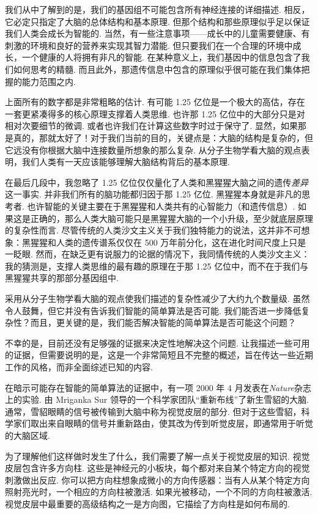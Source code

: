 我们从中了解到的是，我们的基因组不可能包含所有神经连接的详细描述. 相反，它必定只指定了大脑的总体结构和基本原理. 但那个结构和那些原理似乎足以保证我们人类会成长为智能的. 当然，有一些注意事项——成长中的儿童需要健康、有刺激的环境和良好的营养来实现其智力潜能. 但只要我们在一个合理的环境中成长，一个健康的人将拥有非凡的智能. 在某种意义上，我们基因中的信息包含了我们如何思考的精髓. 而且此外，那遗传信息中包含的原理似乎很可能在我们集体把握的能力范围之内.

上面所有的数字都是非常粗略的估计. 有可能 1.25 亿位是一个极大的高估，存在一套更紧凑得多的核心原理支撑着人类思维. 也许那 1.25 亿位中的大部分只是对相对次要细节的微调. 或者也许我们在计算这些数字时过于保守了. 显然，如果那是真的，那就太好了！对于我们当前的目的，关键点是：大脑的结构是复杂的，但它远没有你根据大脑中连接数量所想象的那么复杂. 从分子生物学看大脑的观点表明，我们人类有一天应该能够理解大脑结构背后的基本原理.

在最后几段中，我忽略了 1.25 亿位仅仅量化了人类和黑猩猩大脑之间的遗传\emph{差异}这一事实. 并非我们所有的脑功能都归因于那 1.25 亿位. 黑猩猩本身就是非凡的思考者. 也许智能的关键主要在于黑猩猩和人类共有的心智能力（和遗传信息）. 如果这是正确的，那么人类大脑可能只是黑猩猩大脑的一个小升级，至少就底层原理的复杂性而言. 尽管传统的人类沙文主义关于我们独特能力的说法，这并非不可想象：黑猩猩和人类的遗传谱系仅仅在 500 万年前分化，这在进化时间尺度上只是一眨眼. 然而，在缺乏更有说服力的论据的情况下，我同情传统的人类沙文主义：我的猜测是，支撑人类思维的最有趣的原理在于那 1.25 亿位中，而不在于我们与黑猩猩共享的那部分基因组中.

采用从分子生物学看大脑的观点使我们描述的复杂性减少了大约九个数量级. 虽然令人鼓舞，但它并没有告诉我们智能的简单算法是否可能. 我们能否进一步降低复杂性？而且，更关键的是，我们能否解决智能的简单算法是否可能这个问题？

不幸的是，目前还没有足够强的证据来决定性地解决这个问题. 让我描述一些可用的证据，但需要说明的是，这是一个非常简短且不完整的概述，旨在传达一些近期工作的风格，而非全面综述已知的内容.

在暗示可能存在智能的简单算法的证据中，有一项 2000 年 4 月发表在\emph{Nature}杂志上的实验. 由 Mriganka Sur 领导的一个科学家团队``重新布线''了新生雪貂的大脑. 通常，雪貂眼睛的信号被传输到大脑中称为视觉皮层的部分. 但对于这些雪貂，科学家们取出来自眼睛的信号并重新路由，使其改为传到听觉皮层，即通常用于听觉的大脑区域.

为了理解他们这样做时发生了什么，我们需要了解一点关于视觉皮层的知识. 视觉皮层包含许多方向柱. 这些是神经元的小板块，每个都对来自某个特定方向的视觉刺激做出反应. 你可以把方向柱想象成微小的方向传感器：当有人从某个特定方向照射亮光时，一个相应的方向柱被激活. 如果光被移动，一个不同的方向柱被激活. 视觉皮层中最重要的高级结构之一是方向图，它描绘了方向柱是如何布局的.

